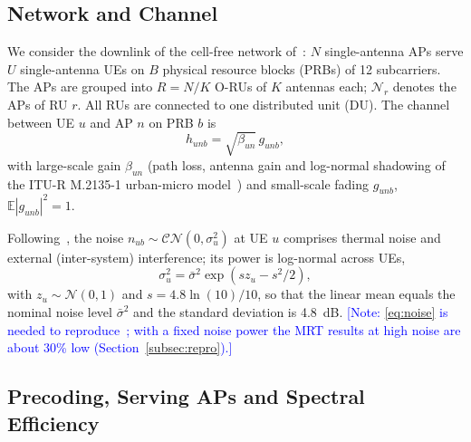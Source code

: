 \documentclass[10pt, final, journal, letterpaper, twocolumn]{IEEEtran}
\newcommand{\note}[1]{\textcolor{blue}{[Note: #1]}}
\begin{document}
\subsection{Network and Channel}
\label{subsec:network}

We consider the downlink of the cell-free network of~\cite{girycki2024eucnc,girycki2024twc}: $N$ single-antenna APs serve $U$ single-antenna UEs on $B$ physical resource blocks (PRBs) of 12 subcarriers. The APs are grouped into $R = N/K$ O-RUs of $K$ antennas each; $\mathcal{N}_r$ denotes the APs of RU $r$. All RUs are connected to one distributed unit (DU). The channel between UE $u$ and AP $n$ on PRB $b$ is
\begin{equation}
  h_{unb} = \sqrt{\beta_{un}}\, g_{unb},
\end{equation}
with large-scale gain $\beta_{un}$ (path loss, antenna gain and log-normal shadowing of the ITU-R M.2135-1 urban-micro model~\cite{itur_m2135}) and small-scale fading $g_{unb}$, $\mathbb{E}|g_{unb}|^2=1$.

Following~\cite{girycki2024twc}, the noise $n_{ub}\sim\mathcal{CN}(0,\sigma_u^2)$ at UE $u$ comprises thermal noise and external (inter-system) interference; its power is log-normal across UEs,
\begin{equation}
  \sigma_u^2 = \bar\sigma^2 \exp\!\left(s z_u - s^2/2\right),
  \label{eq:noise}
\end{equation}
with $z_u\sim\mathcal{N}(0,1)$ and $s=4.8\ln(10)/10$, so that the linear mean equals the nominal noise level $\bar\sigma^2$ and the standard deviation is 4.8~dB.
\note{\eqref{eq:noise} is needed to reproduce~\cite{girycki2024eucnc}; with a fixed noise power the MRT results at high noise are about 30\% low (Section~\ref{subsec:repro}).}

\subsection{Precoding, Serving APs and Spectral Efficiency}
\label{subsec:precoding}
\end{document}
